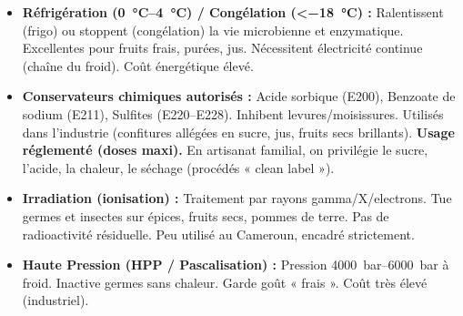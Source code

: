 \documentclass[11pt]{article}
\begin{document}
\begin{itemize}
    \item \textbf{Réfrigération (\SIrange{0}{4}{\celsius}) / Congélation (\textless \SI{-18}{\celsius}) :} Ralentissent (frigo) ou stoppent (congélation) la vie microbienne et enzymatique. Excellentes pour fruits frais, purées, jus. Nécessitent électricité continue (chaîne du froid). Coût énergétique élevé.
    \item \textbf{Conservateurs chimiques autorisés :} Acide sorbique (E200), Benzoate de sodium (E211), Sulfites (E220--E228). Inhibent levures/moisissures. Utilisés dans l'industrie (confitures allégées en sucre, jus, fruits secs brillants). \textbf{Usage réglementé (doses maxi).} En artisanat familial, on privilégie le sucre, l'acide, la chaleur, le séchage (procédés « clean label »).
    \item \textbf{Irradiation (ionisation) :} Traitement par rayons gamma/X/electrons. Tue germes et insectes sur épices, fruits secs, pommes de terre. Pas de radioactivité résiduelle. Peu utilisé au Cameroun, encadré strictement.
    \item \textbf{Haute Pression (HPP / Pascalisation) :} Pression \SIrange{4000}{6000}{bar} à froid. Inactive germes sans chaleur. Garde goût « frais ». Coût très élevé (industriel).
\end{itemize}
\end{document}
